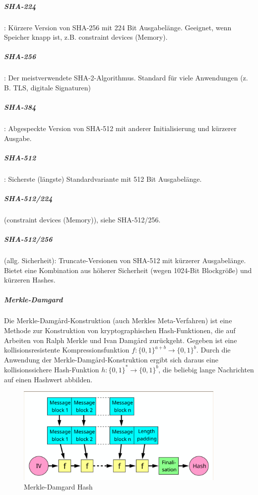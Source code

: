 \subparagraph{SHA-224}: Kürzere Version von SHA-256 mit 224 Bit Ausgabelänge. Geeignet, wenn Speicher knapp ist, z.B. constraint devices (Memory).
\subparagraph{SHA-256}: Der meistverwendete SHA-2-Algorithmus. Standard für viele Anwendungen (z. B. TLS, digitale Signaturen)
\subparagraph{SHA-384}: Abgespeckte Version von SHA-512 mit anderer Initialisierung und kürzerer Ausgabe.
\subparagraph{SHA-512}: Sicherste (längste) Standardvariante mit 512 Bit Ausgabelänge.
\subparagraph{SHA-512/224} (constraint devices (Memory)), siehe SHA-512/256.  
\subparagraph{SHA-512/256} (allg. Sicherheit): Truncate-Versionen von SHA-512 mit kürzerer Ausgabelänge. Bietet eine Kombination aus höherer
Sicherheit (wegen 1024-Bit Blockgröße) und kürzeren Hashes.


\subparagraph{Merkle-Damgard}

Die Merkle-Damg\r{a}rd-Konstruktion (auch Merkles Meta-Verfahren) ist eine Methode zur Konstruktion von kryptographischen Hash-Funktionen, die auf Arbeiten von 
Ralph Merkle und Ivan Damg\r{a}rd zurückgeht.
Gegeben ist eine kollisionsresistente Kompressionsfunktion $f: \{0, 1\}^{a+b} \to \{0, 1\}^b$. Durch die Anwendung der Merkle-Damg\r{a}rd-Konstruktion ergibt sich daraus 
eine kollisionssichere Hash-Funktion $h: \{0, 1\}^* \to \{0, 1\}^b$, die beliebig lange Nachrichten auf einen Hashwert abbilden.

\begin{figure}[h]
    \includegraphics[width=0.9\textwidth]{figures/fig10-merkle-damgard}
    \centering
    \caption{Merkle-Damgard Hash}
\end{figure}


